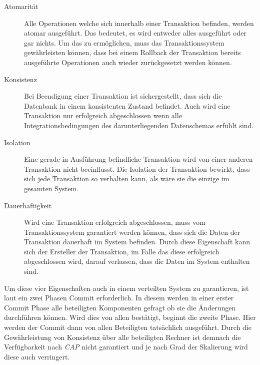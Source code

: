 \begin{description}
  \item[Atomarität] Alle Operationen welche sich innerhalb einer Transaktion befinden, werden atomar ausgeführt. Das bedeutet, es wird entweder alles ausgeführt oder gar nichts. Um das zu ermöglichen, muss das Transaktionssystem gewährleisten können, dass bei einem Rollback der Transaktion bereits ausgeführte Operationen auch wieder zurückgesetzt werden können. 
  \item[Konsistenz] Bei Beendigung einer Transaktion ist sichergestellt, dass sich die Datenbank in einem konsistenten Zustand befindet. Auch wird eine Transaktion nur erfolgreich abgeschlossen wenn alle Integrationsbedingungen des darunterliegenden Datenschemas erfühlt sind. 
  \item[Isolation] Eine gerade in Ausführung befindliche Transaktion wird von einer anderen Transaktion nicht beeinflusst. Die Isolation der Transaktion bewirkt, dass sich jede Transaktion so verhalten kann, als wäre sie die einzige im gesamten System.
  \item[Dauerhaftigkeit] Wird eine Transaktion erfolgreich abgeschlossen, muss vom Transaktionssystem garantiert werden können, dass sich die Daten der Transaktion dauerhaft im System befinden. Durch diese Eigenschaft kann sich der Ersteller der Transaktion, im Falle das diese erfolgreich abgeschlossen wird, darauf verlassen, dass die Daten im System enthalten sind.
\end{description}
Um diese vier Eigenschaften auch in einem verteilten System zu garantieren, ist laut \cite{PritchettBASE} ein zwei Phasen Commit erforderlich. In diesem werden in einer erster Commit Phase alle beteiligten Komponenten gefragt ob sie die Änderungen durchführen können. Wird dies von allen bestätigt, beginnt die zweite Phase. Hier werden der Commit dann von allen Beteiligten tatsächlich ausgeführt. Durch die Gewährleistung von Konsistenz über alle beteiligten Rechner ist demnach die Verfügbarkeit nach \textit{CAP} nicht garantiert und je nach Grad der Skalierung wird diese auch verringert.

